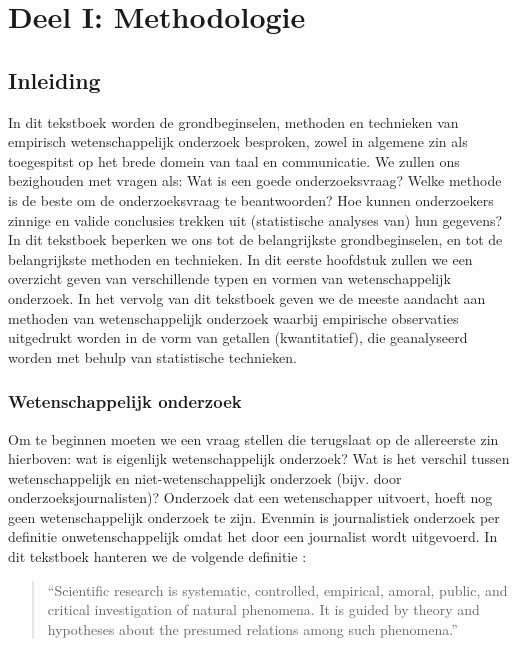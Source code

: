 \documentclass[
]{book}
\begin{document}
\hypertarget{part-deel-i-methodologie}{%
\part*{Deel I: Methodologie}\label{part-deel-i-methodologie}}

\hypertarget{ch:inleiding}{%
\chapter{Inleiding}\label{ch:inleiding}}

In dit tekstboek worden de grondbeginselen, methoden en technieken van
empirisch wetenschappelijk onderzoek besproken, zowel in algemene zin
als toegespitst op het brede domein van taal en communicatie. We zullen ons bezighouden met vragen als: Wat is een goede onderzoeksvraag? Welke methode is de beste om de onderzoeksvraag te beantwoorden? Hoe kunnen onderzoekers zinnige en valide conclusies trekken uit (statistische analyses van) hun gegevens? In dit tekstboek beperken we ons tot de belangrijkste grondbeginselen, en tot de belangrijkste methoden en technieken. In dit eerste hoofdstuk zullen we een overzicht geven van verschillende typen en vormen van wetenschappelijk onderzoek. In het vervolg van dit tekstboek geven we de meeste aandacht aan methoden van wetenschappelijk onderzoek waarbij empirische observaties uitgedrukt worden in de vorm van getallen (kwantitatief), die geanalyseerd worden met behulp van statistische technieken.

\hypertarget{sec:wetenschappelijk-onderzoek}{%
\section{Wetenschappelijk onderzoek}\label{sec:wetenschappelijk-onderzoek}}

Om te beginnen moeten we een vraag stellen die terugslaat op de
allereerste zin hierboven: wat is eigenlijk wetenschappelijk onderzoek?
Wat is het verschil tussen wetenschappelijk en niet-wetenschappelijk
onderzoek (bijv. door onderzoeksjournalisten)? Onderzoek dat een
wetenschapper uitvoert, hoeft nog geen wetenschappelijk onderzoek te
zijn. Evenmin is journalistiek onderzoek per definitie
onwetenschappelijk omdat het door een journalist wordt uitgevoerd. In
dit tekstboek hanteren we de volgende definitie \citep[p.14]{KL00}:

\begin{quote}
``Scientific
research is systematic, controlled, empirical, amoral, public, and
critical investigation of natural phenomena. It is guided by theory and hypotheses about the presumed relations among such phenomena.''
\end{quote}
\end{document}
